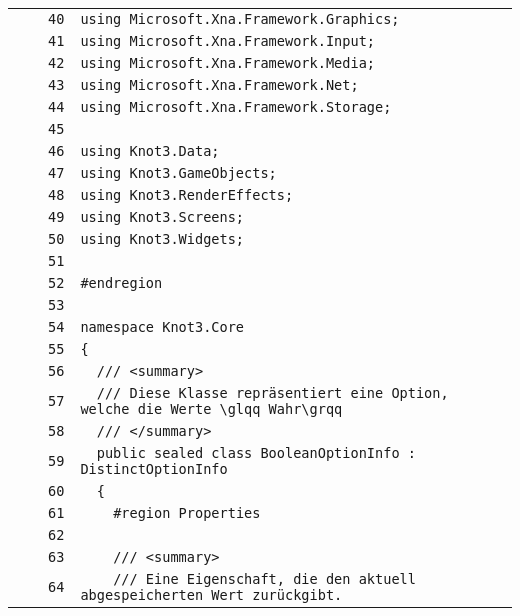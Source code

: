 \documentclass[a4paper,10pt]{article}
\begin{document}
\begin{longtable}[l]{lrrl}
\cellcolor{gray} &  & \verb~40~ & \verb~using Microsoft.Xna.Framework.Graphics;~\\
\cellcolor{gray} &  & \verb~41~ & \verb~using Microsoft.Xna.Framework.Input;~\\
\cellcolor{gray} &  & \verb~42~ & \verb~using Microsoft.Xna.Framework.Media;~\\
\cellcolor{gray} &  & \verb~43~ & \verb~using Microsoft.Xna.Framework.Net;~\\
\cellcolor{gray} &  & \verb~44~ & \verb~using Microsoft.Xna.Framework.Storage;~\\
\cellcolor{gray} &  & \verb~45~ & \verb~~\\
\cellcolor{gray} &  & \verb~46~ & \verb~using Knot3.Data;~\\
\cellcolor{gray} &  & \verb~47~ & \verb~using Knot3.GameObjects;~\\
\cellcolor{gray} &  & \verb~48~ & \verb~using Knot3.RenderEffects;~\\
\cellcolor{gray} &  & \verb~49~ & \verb~using Knot3.Screens;~\\
\cellcolor{gray} &  & \verb~50~ & \verb~using Knot3.Widgets;~\\
\cellcolor{gray} &  & \verb~51~ & \verb~~\\
\cellcolor{gray} &  & \verb~52~ & \verb~#endregion~\\
\cellcolor{gray} &  & \verb~53~ & \verb~~\\
\cellcolor{gray} &  & \verb~54~ & \verb~namespace Knot3.Core~\\
\cellcolor{gray} &  & \verb~55~ & \verb~{~\\
\cellcolor{gray} &  & \verb~56~ & \verb~  /// <summary>~\\
\cellcolor{gray} &  & \verb~57~ & \verb~  /// Diese Klasse repräsentiert eine Option, welche die Werte \glqq Wahr\grqq~\\
\cellcolor{gray} &  & \verb~58~ & \verb~  /// </summary>~\\
\cellcolor{gray} &  & \verb~59~ & \verb~  public sealed class BooleanOptionInfo : DistinctOptionInfo~\\
\cellcolor{gray} &  & \verb~60~ & \verb~  {~\\
\cellcolor{gray} &  & \verb~61~ & \verb~    #region Properties~\\
\cellcolor{gray} &  & \verb~62~ & \verb~~\\
\cellcolor{gray} &  & \verb~63~ & \verb~    /// <summary>~\\
\cellcolor{gray} &  & \verb~64~ & \verb~    /// Eine Eigenschaft, die den aktuell abgespeicherten Wert zurückgibt.~\\

\end{longtable}
\end{document}
